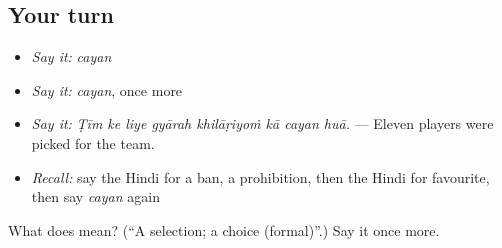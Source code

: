 \subsection*{Your turn}
\begin{itemize}
\raggedright
  \item \emph{Say it:} \emph{cayan}
  \item \emph{Say it:} \emph{cayan}, once more
  \item \emph{Say it:} \emph{Ṭīm ke liye gyārah khilāṛiyoṁ kā cayan huā.} — Eleven players were picked for the team.
  \item \emph{Recall:} say the Hindi for a ban, a prohibition, then the Hindi for favourite, then say \emph{cayan} again
\end{itemize}

\begin{tcolorbox}[breakable,colback=teal!4,colframe=teal!35!black,title={Before you move on}]
What does  mean? (\textquotedblleft{}A selection; a choice (formal)\textquotedblright{}.) Say it once more.
\end{tcolorbox}
